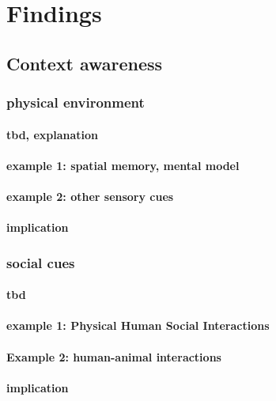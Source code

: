 \section{Findings}

\subsection{Context awareness}
\subsubsection{physical environment}
\paragraph{tbd, explanation}

\paragraph{example 1: spatial memory, mental model}


\paragraph{example 2: other sensory cues}


\paragraph{implication}



\subsubsection{social cues}

\paragraph{tbd}

\paragraph{example 1: Physical Human Social Interactions}

\paragraph{Example 2: human-animal interactions}

\paragraph{implication}





